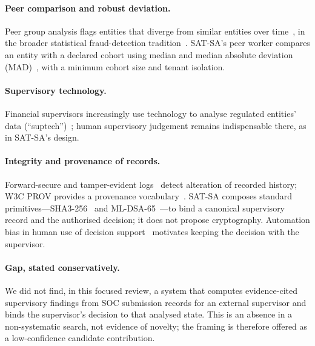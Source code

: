 \paragraph{Peer comparison and robust deviation.}
Peer group analysis flags entities that diverge from similar entities over
time~\citep{weston2008pga}, in the broader statistical fraud-detection
tradition~\citep{bolton2002fraud}. SAT-SA's peer worker compares an entity with a
declared cohort using median and median absolute deviation (MAD)~\citep{leys2013mad},
with a minimum cohort size and tenant isolation.

\paragraph{Supervisory technology.}
Financial supervisors increasingly use technology to analyse regulated
entities' data (``suptech'')~\citep{broeders2018suptech}; human supervisory
judgement remains indispensable there, as in SAT-SA's design.

\paragraph{Integrity and provenance of records.}
Forward-secure and tamper-evident logs~\citep{schneier1999logs,crosby2009logging}
detect alteration of recorded history; W3C PROV provides a provenance
vocabulary~\citep{w3c2013provdm}. SAT-SA composes standard primitives---SHA3-256~\citep{nist2015fips202}
and ML-DSA-65~\citep{nist2024fips204}---to bind a canonical supervisory record and the
authorised decision; it does not propose cryptography. Automation bias in human
use of decision support~\citep{parasuraman2010automation} motivates keeping the
decision with the supervisor.

\paragraph{Gap, stated conservatively.}
We did not find, in this focused review, a system that computes evidence-cited
supervisory findings from SOC submission records for an external supervisor and
binds the supervisor's decision to that analysed state. This is an absence in a
non-systematic search, not evidence of novelty; the framing is therefore offered
as a low-confidence candidate contribution.
